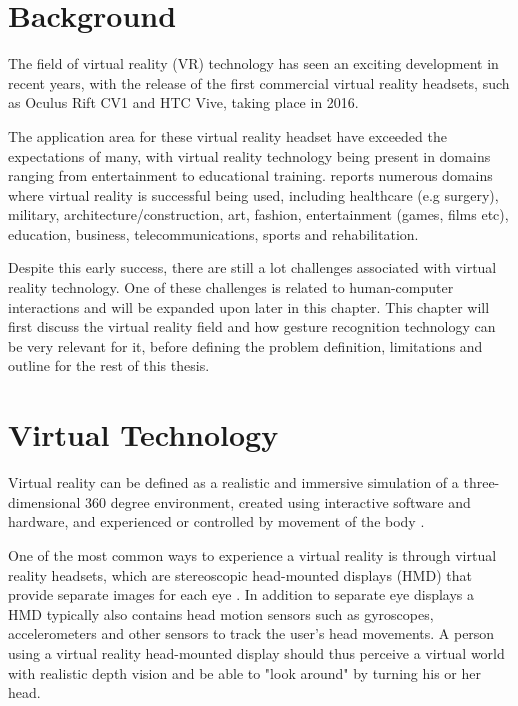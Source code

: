 \section{Background}            
The field of virtual reality (VR) technology has seen an exciting development in recent years, 
with the release of the first commercial virtual reality headsets, such as Oculus Rift CV1 and HTC Vive, taking place in 2016.

The application area for these virtual reality headset have exceeded the expectations of many, with virtual reality 
technology being present in domains ranging from entertainment to educational training\citep{VRS2016}. 
\citet{VRS2016} reports numerous domains where virtual reality is successful being used, including 
healthcare (e.g surgery), military, architecture/construction, art, fashion, entertainment (games, films etc), education, business, telecommunications, sports and rehabilitation.

Despite this early success, there are still a lot challenges associated with virtual reality technology. One of these challenges is related to human-computer interactions
and will be expanded upon later in this chapter. This chapter will first discuss the virtual reality field and how gesture recognition technology can be very relevant for it,
before defining the problem definition, limitations and outline for the rest of this thesis.



\section{Virtual Technology}
Virtual reality can be defined as a realistic and immersive simulation of a three-dimensional 360 degree environment, 
created using interactive software and hardware, and experienced or controlled by movement of the body \citep{VRS2016}.

One of the most common ways to experience a virtual reality is through virtual reality headsets, which are stereoscopic head-mounted displays (HMD) 
that provide separate images for each eye \citep{POLYGON2016}. 
In addition to separate eye displays a HMD typically also contains head motion sensors such as gyroscopes, accelerometers 
and other sensors to track the user's head movements\citep{TW2016}. 
A person using a virtual reality head-mounted display should thus perceive a virtual world with realistic depth vision and be able to "look around" by turning his or her head.

